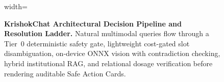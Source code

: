 \begin{figure}[t]
\begin{adjustbox}{width=\textwidth}
\end{adjustbox}
\caption{\textbf{KrishokChat Architectural Decision Pipeline and Resolution Ladder.} Natural multimodal queries flow through a Tier~0 deterministic safety gate, lightweight cost-gated slot disambiguation, on-device ONNX vision with contradiction checking, hybrid institutional RAG, and relational dosage verification before rendering auditable Safe Action Cards.}
\label{fig:system_architecture}
\end{figure}
